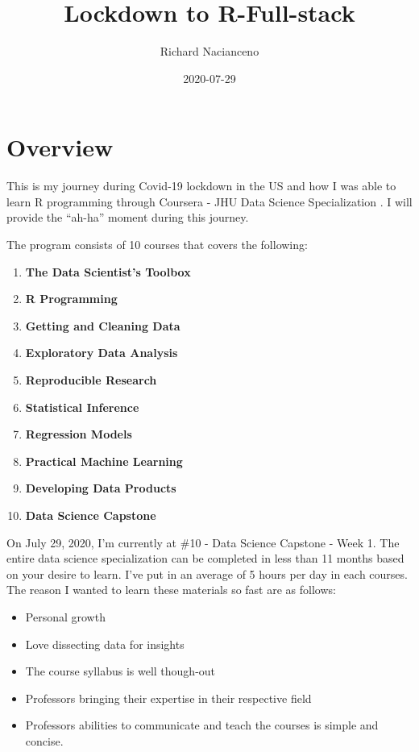 \documentclass[
]{book}
\title{Lockdown to R-Full-stack}
\author{Richard Nacianceno}
\date{2020-07-29}
\providecommand{\tightlist}{%
  \setlength{\itemsep}{0pt}\setlength{\parskip}{0pt}}
\begin{document}
\maketitle

{
\setcounter{tocdepth}{1}
\tableofcontents
}
\hypertarget{overview}{%
\chapter*{Overview}\label{overview}}

This is my journey during Covid-19 lockdown in the US and how I was able to learn R programming through Coursera - JHU Data Science Specialization \citep{dss}. I will provide the ``ah-ha'' moment during this journey.

The program consists of 10 courses that covers the following:

\begin{enumerate}
\def\labelenumi{\arabic{enumi}.}
\tightlist
\item
  \textbf{The Data Scientist's Toolbox}
\item
  \textbf{R Programming}
\item
  \textbf{Getting and Cleaning Data}
\item
  \textbf{Exploratory Data Analysis}
\item
  \textbf{Reproducible Research}
\item
  \textbf{Statistical Inference}
\item
  \textbf{Regression Models}
\item
  \textbf{Practical Machine Learning}
\item
  \textbf{Developing Data Products}
\item
  \textbf{Data Science Capstone}
\end{enumerate}

On July 29, 2020, I'm currently at \#10 - Data Science Capstone - Week 1. The entire data science specialization can be completed in less than 11 months based on your desire to learn. I've put in an average of 5 hours per day in each courses. The reason I wanted to learn these materials so fast are as follows:

\begin{itemize}
\tightlist
\item
  Personal growth
\item
  Love dissecting data for insights
\item
  The course syllabus is well though-out
\item
  Professors bringing their expertise in their respective field
\item
  Professors abilities to communicate and teach the courses is simple and concise.
\end{itemize}
\end{document}
